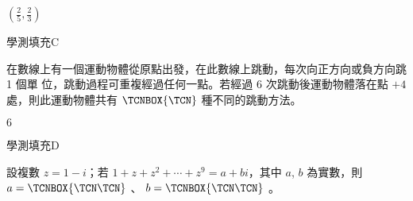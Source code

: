 \begin{QUESTIONS}
\begin{QUESTION}
\begin{QANS}
            $(\frac{2}{5},\frac{2}{3})$
        \end{QANS}
        \begin{QSOLLIST}
        \end{QSOLLIST}
        \begin{QEMPTYSPACE}
        \end{QEMPTYSPACE}
    \end{QUESTION}
    \begin{QUESTION}
        \begin{ExamInfo}{94}{學測}{填充}{C}
        \end{ExamInfo}
        \begin{ExamAnsRateInfo}{51}{80}{51}{22}
        \end{ExamAnsRateInfo}
        \begin{QBODY}
            在數線上有一個運動物體從原點出發，在此數線上跳動，每次向正方向或負方向跳 1 個單 位，跳動過程可重複經過任何一點。若經過 6 次跳動後運動物體落在點 $+4$ 處，則此運動物體共有 
			$\TCNBOX{\TCN}$ 種不同的跳動方法。
        \end{QBODY}
        \begin{QFROMS}
        \end{QFROMS}
        \begin{QTAGS}\end{QTAGS}
        \begin{QANS}
            $6$
        \end{QANS}
        \begin{QSOLLIST}
        \end{QSOLLIST}
        \begin{QEMPTYSPACE}
        \end{QEMPTYSPACE}
    \end{QUESTION}
    \begin{QUESTION}
        \begin{ExamInfo}{94}{學測}{填充}{D}
        \end{ExamInfo}
        \begin{ExamAnsRateInfo}{21}{48}{14}{1}
        \end{ExamAnsRateInfo}
        \begin{QBODY}
            設複數 $z=1-i$；若 $1+z+z^2 + \cdots +z^9 =a+bi$，其中 $a$, $b$ 為實數，則$ a= \TCNBOX{\TCN\TCN}$ 、 $b=\TCNBOX{\TCN\TCN}$ 。
        \end{QBODY}
        \begin{QFROMS}
        \end{QFROMS}

\end{QUESTION}
\end{QUESTIONS}
